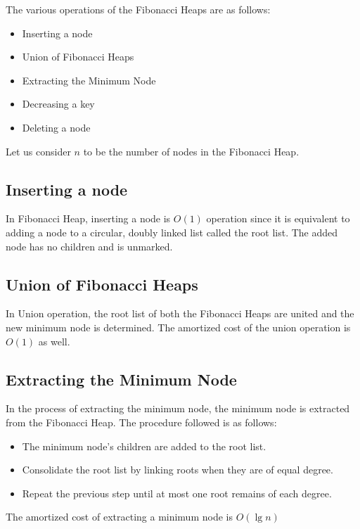 

The various operations of the Fibonacci Heaps are as follows:
\begin{itemize}
	\item Inserting a node
	\item Union of Fibonacci Heaps
	\item Extracting the Minimum Node
	\item Decreasing a key
	\item Deleting a node
\end{itemize}

Let us consider $n$ to be the number of nodes in the Fibonacci Heap.

\subsection{Inserting a node}
In Fibonacci Heap, inserting a node is $O(1)$ operation since it is equivalent to adding a node to a circular, doubly linked list called the root list. The added node has no children and is unmarked.

\subsection{Union of Fibonacci Heaps}
In Union operation, the root list of both the Fibonacci Heaps are united  and the new minimum node is determined. The amortized cost of the union operation is $O(1)$ as well.

\subsection{Extracting the Minimum Node}
In the process of extracting the minimum node, the minimum node is extracted from the Fibonacci Heap. The procedure followed is as follows:
\begin{itemize}
	\item The minimum node's children are added to the root list.
	\item Consolidate the root list by linking roots when they are of equal degree.
	\item Repeat the previous step until at most one root remains of each degree.
\end{itemize}
The amortized cost of extracting a minimum node is $O(\lg{n})$

